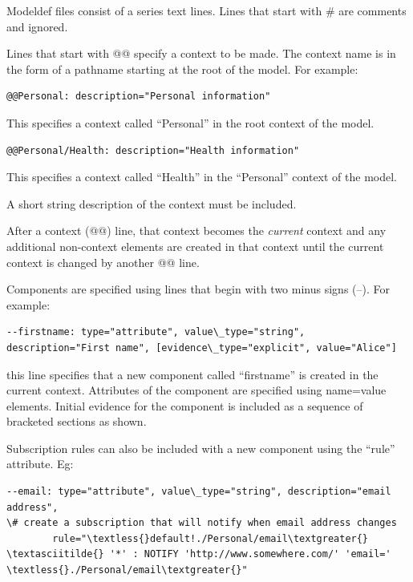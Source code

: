 \documentclass[a4paper,10pt,english]{sphinxmanual}
\begin{document}
Modeldef files consist of a series text lines. Lines that start with \# are comments and ignored.

Lines that start with @@ specify a context to be made. The context name is in the form of a pathname starting
at the root of the model. For example:

\begin{Verbatim}[commandchars=\\\{\}]
@@Personal: description="Personal information"
\end{Verbatim}

This specifies a context called ``Personal'' in the root context of the model.

\begin{Verbatim}[commandchars=\\\{\}]
@@Personal/Health: description="Health information"
\end{Verbatim}

This specifies a context called ``Health'' in the ``Personal'' context of the model.

A short string description of the context must be included.

After a context (@@) line, that context becomes the \emph{current} context and any additional non-context elements
are created in that context until the current context is changed by another @@ line.

Components are specified using lines that begin with two minus signs (--). For example:

\begin{Verbatim}[commandchars=\\\{\}]
--firstname: type="attribute", value\_type="string", description="First name", [evidence\_type="explicit", value="Alice"]
\end{Verbatim}

this line specifies that a new component called ``firstname'' is created in the current context.
Attributes of the component are specified using name=value elements.
Initial evidence for the component is included as a sequence of bracketed sections as shown.

Subscription rules can also be included with a new component using the ``rule'' attribute. Eg:

\begin{Verbatim}[commandchars=\\\{\}]
--email: type="attribute", value\_type="string", description="email address",
\# create a subscription that will notify when email address changes
        rule="\textless{}default!./Personal/email\textgreater{} \textasciitilde{} '*' : NOTIFY 'http://www.somewhere.com/' 'email=' \textless{}./Personal/email\textgreater{}"
\end{Verbatim}
\end{document}
